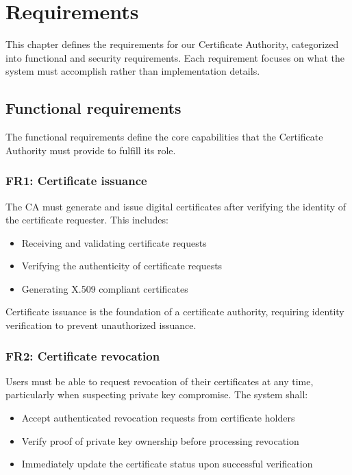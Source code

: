 \chapter{Requirements}

This chapter defines the requirements for our Certificate Authority, 
categorized into functional and security requirements. Each requirement focuses 
on what the system must accomplish rather than implementation details.

\section{Functional requirements}

The functional requirements define the core capabilities that the Certificate 
Authority must provide to fulfill its role.

\subsection{FR1: Certificate issuance}

The CA must generate and issue digital certificates after verifying the 
identity of the certificate requester. This includes:

\begin{itemize}
    \item Receiving and validating certificate requests
    \item Verifying the authenticity of certificate requests
    \item Generating X.509 compliant certificates
\end{itemize}

Certificate issuance is the foundation of a certificate authority, 
requiring identity verification to prevent unauthorized issuance.

\subsection{FR2: Certificate revocation}

Users must be able to request revocation of their certificates at any time, 
particularly when suspecting private key compromise. The system shall:

\begin{itemize}
    \item Accept authenticated revocation requests from certificate holders
    \item Verify proof of private key ownership before processing revocation
    \item Immediately update the certificate status upon successful verification
\end{itemize}

